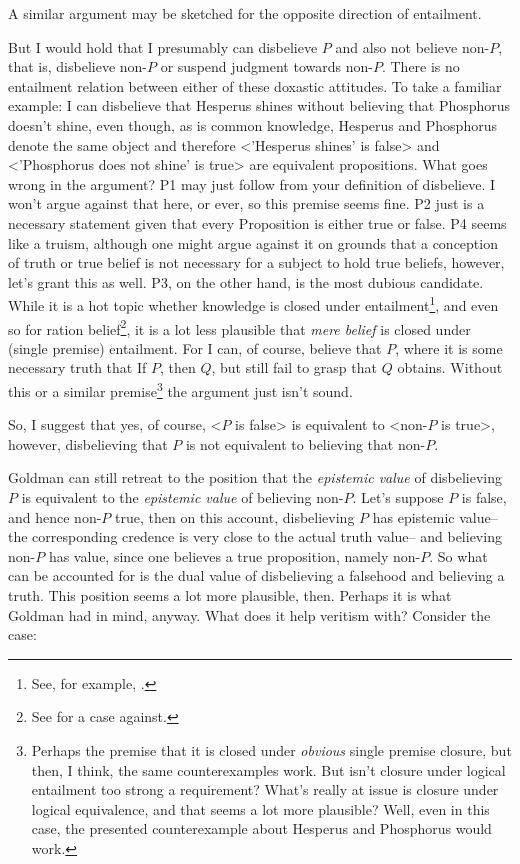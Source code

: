 \documentclass[12pt,numbers=noenddot]{scrartcl}
\begin{document}
A similar argument may be sketched for the opposite direction of entailment.

But I would hold that I presumably can disbelieve $P$ and also not believe non-$P$, that is, disbelieve non-$P$ or suspend judgment towards non-$P$. There is no entailment relation between either of these doxastic attitudes. To take a familiar example: I can disbelieve that Hesperus shines without believing that Phosphorus doesn't shine, even though, as is common knowledge, Hesperus and Phosphorus denote the same object and therefore <'Hesperus shines' is false> and <'Phosphorus does not shine' is true> are equivalent propositions. What goes wrong in the argument? P1 may just follow from your definition of disbelieve. I won't argue against that here, or ever, so this premise seems fine. P2 just is a necessary statement given that every Proposition is either true or false. P4 seems like a truism, although one might argue against it on grounds that a conception of truth or true belief is not necessary for a subject to hold true beliefs, however, let's grant this as well. P3, on the other hand, is the most dubious candidate. While it is a hot topic whether knowledge is closed under entailment\footnote{See, for example, \textcite{Dretske2005-DREIKC}.}, and even so for ration belief\footnote{See \textcite{KyburgJr1970-KYBC-2} for a case against.}, it is a lot less plausible that \emph{mere belief} is closed under (single premise) entailment. For I can, of course, believe that $P$, where it is some necessary truth that If $P$, then $Q$, but still fail to grasp that $Q$ obtains. Without this or a similar premise\footnote{Perhaps the premise that it is closed under \emph{obvious} single premise closure, but then, I think, the same counterexamples work. But isn't closure under logical entailment too strong a requirement? What's really at issue is closure under logical equivalence, and that seems a lot more plausible? Well, even in this case, the presented counterexample about Hesperus and Phosphorus would work.} the argument just isn't sound.

So, I suggest that yes, of course, <$P$ is false> is equivalent to <non-$P$ is true>, however, disbelieving that $P$ is not equivalent to believing that non-$P$.

Goldman can still retreat to the position that the \emph{epistemic value} of disbelieving $P$ is equivalent to the \emph{epistemic value} of believing non-$P$. Let's suppose $P$ is false, and hence non-$P$ true, then on this account, disbelieving $P$ has epistemic value–the corresponding credence is very close to the actual truth value– and believing non-$P$ has value, since one believes a true proposition, namely non-$P$. So what can be accounted for is the dual value of disbelieving a falsehood and believing a truth. This position seems a lot more plausible, then. Perhaps it is what Goldman had in mind, anyway. What does it help veritism with? Consider the case:
\end{document}
